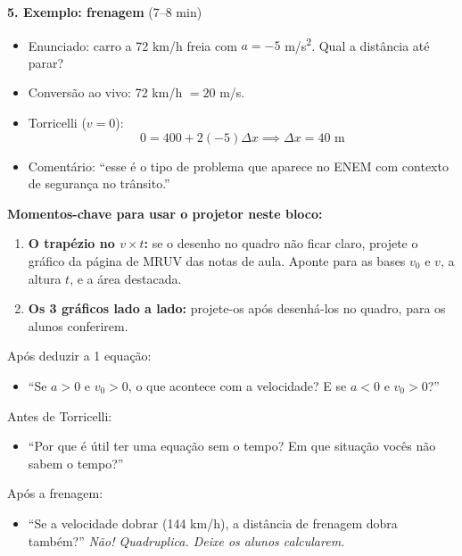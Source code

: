 \documentclass[12pt,a4paper]{article}
\begin{document}
\begin{tcolorbox}[quadrobox]
  \medskip
  \textbf{5. Exemplo: frenagem} (7--8 min)
  \begin{itemize}[nosep]
    \item Enunciado: carro a 72 km/h freia com $a = -5$ m/s\textsuperscript{2}.
          Qual a distância até parar?
    \item Convers\~ao ao vivo: 72 km/h $= 20$ m/s.
    \item Torricelli ($v = 0$):
    \[
      0 = 400 + 2(-5)\Delta x \implies \Delta x = 40\text{ m}
    \]
    \item Coment\'ario: ``esse \'e o tipo de problema que aparece no
          ENEM com contexto de seguran\c{c}a no tr\^ansito.''
  \end{itemize}
\end{tcolorbox}

\begin{tcolorbox}[projetorbox]
  \textbf{Momentos-chave para usar o projetor neste bloco:}
  \begin{enumerate}[nosep]
    \item \textbf{O trap\'ezio no $v \times t$:} se o desenho no quadro
          n\~ao ficar claro, projete o gr\'afico da p\'agina de MRUV
          das notas de aula.
          Aponte para as bases $v_0$ e $v$, a altura $t$, e a \'area
          destacada.
    \item \textbf{Os 3 gr\'aficos lado a lado:} projete-os ap\'os
          desenhá-los no quadro, para os alunos conferirem.
  \end{enumerate}
\end{tcolorbox}

\begin{tcolorbox}[perguntabox]
  Ap\'os deduzir a 1\textordfeminine{} equa\c{c}\~ao:
  \begin{itemize}[nosep]
    \item ``Se $a > 0$ e $v_0 > 0$, o que acontece com a velocidade?
          E se $a < 0$ e $v_0 > 0$?''
  \end{itemize}
  Antes de Torricelli:
  \begin{itemize}[nosep]
    \item ``Por que \'e \'util ter uma equa\c{c}\~ao sem o tempo?
          Em que situa\c{c}\~ao voc\^es n\~ao sabem o tempo?''
  \end{itemize}
  Ap\'os a frenagem:
  \begin{itemize}[nosep]
    \item ``Se a velocidade dobrar (144 km/h), a dist\^ancia de
          frenagem dobra tamb\'em?''
          \textit{N\~ao! Quadruplica. Deixe os alunos calcularem.}
  \end{itemize}
\end{tcolorbox}
\end{document}
